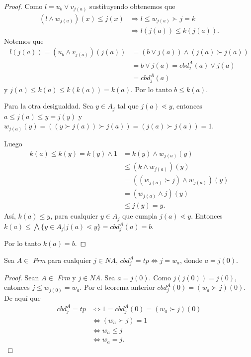 \begin{proof}
Como $l=u_b\vee v_{j(a)}$ sustituyendo obtenemos que 
\begin{equation*}
\begin{split}
(l\wedge w_{j(a)})(x)\leq j(x) & \Rightarrow l\leq w_{j(a)}\succ j=k\\
& \Rightarrow l(j(a))\leq k(j(a)).
\end{split}
\end{equation*}
Notemos que 
\begin{equation*}
\begin{split}
l(j(a))=(u_b\wedge v_{j(a)})(j(a))& =(b\vee j(a))\wedge (j(a)\succ j(a))\\
& =b\vee j(a)=cbd_j^A(a)\vee j(a)\\
& =cbd_j^A(a)
\end{split}
\end{equation*}
y $j(a)\leq k(a)\leq k(k(a))=k(a)$. Por lo tanto $b\leq k(a)$.

Para la otra desigualdad. Sea $y\in A_j$ tal que $j(a)\lessdot y$, entonces $a\leq j(a)\leq y=j(y)$ y $w_{j(a)}(y)=((y\succ j(a))\succ j(a))=(j(a)\succ j(a))=1$.

Luego 
\begin{equation*}
\begin{split}
k(a)\leq k(y)=k(y)\wedge 1 & =k(y)\wedge w_{j(a)}(y)\\
& \leq (k\wedge w_{j(a)})(y)\\
& =((w_{j(a)}\succ j)\wedge w_{j(a)})(y)\\
& =(w_{j(a)}\wedge j)(y)\\
& \leq j(y)=y.
\end{split}
\end{equation*}
Así, $k(a)\leq y$, para cualquier $y\in A_j$ que cumpla $j(a)\lessdot y$. Entonces $k(a)\leq \bigwedge\{y\in A_j|j(a)\lessdot y\}=cbd_j^A(a)=b$.

\noindent
Por lo tanto $k(a)=b$.
\end{proof}

\begin{corollary}
Sea $A\in$ \textit{Frm} para cualquier $j\in NA$, $cbd_j^A=tp\Leftrightarrow j=w_a$, donde $a=j(0)$.
\end{corollary}

\begin{proof}
Sean $A\in$ \textit{Frm} y $j\in NA$. Sea $a=j(0)$. Como $j(j(0))=j(0)$, entonces $j\leq w_{j(0)}=w_a$. Por el teorema anterior $cbd_j^A(0)=(w_a\succ j)(0)$. De aquí que
\begin{equation*}
\begin{split}
cbd_j^A=tp & \Leftrightarrow 1=cbd_j^A(0)=(w_a\succ j)(0)\\
& \Leftrightarrow (w_a\succ j)=1\\ 
& \Leftrightarrow w_a\leq j\\
& \Leftrightarrow w_a=j.
\end{split}
\end{equation*}

\end{proof}

